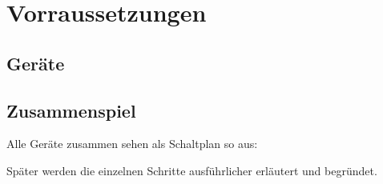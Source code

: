 \section{Vorraussetzungen}
\label{Vorraussetzungen}


\subsection{Geräte}

\subsection{Zusammenspiel}

Alle Geräte zusammen sehen als Schaltplan so aus:

Später werden die einzelnen Schritte ausführlicher erläutert und begründet.